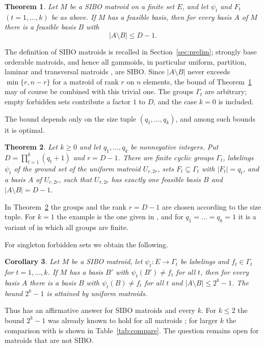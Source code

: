 \documentclass{amsart}
\newtheorem{theorem}{Theorem}[section]
\newtheorem{corollary}[theorem]{Corollary}
\theoremstyle{definition}
\theoremstyle{remark}
\begin{document}
\begin{theorem}\label{thm:main}
Let $M$ be a SIBO matroid on a finite set $E$, and let $\psi_t$ and $F_t$ $(t=1,\dots,k)$ be as above. If $M$ has a feasible basis, then for every basis $A$ of $M$ there is a feasible basis $B$ with
\[
|A\setminus B|\le D-1.
\]
\end{theorem}

The definition of SIBO matroids is recalled in Section~\ref{sec:prelim}; strongly base orderable matroids, and hence all gammoids, in particular uniform, partition, laminar and transversal matroids \cite[Section~42.6c]{Schrijver}, are SIBO. Since $|A\setminus B|$ never exceeds $\min\{r,n-r\}$ for a matroid of rank $r$ on $n$ elements, the bound of Theorem~\ref{thm:main} may of course be combined with this trivial one. The groups $\Gamma_t$ are arbitrary; empty forbidden sets contribute a factor $1$ to $D$, and the case $k=0$ is included.

The bound depends only on the size tuple $(q_1,\dots,q_k)$, and among such bounds it is optimal.

\begin{theorem}\label{thm:sharp}
Let $k\ge0$ and let $q_1,\dots,q_k$ be nonnegative integers. Put $D=\prod_{t=1}^k(q_t+1)$ and $r=D-1$. There are finite cyclic groups $\Gamma_t$, labelings $\psi_t$ of the ground set of the uniform matroid $U_{r,2r}$, sets $F_t\subseteq\Gamma_t$ with $|F_t|=q_t$, and a basis $A$ of $U_{r,2r}$, such that $U_{r,2r}$ has exactly one feasible basis $B$ and $|A\setminus B|=D-1$.
\end{theorem}

In Theorem~\ref{thm:sharp} the groups and the rank $r=D-1$ are chosen according to the size tuple. For $k=1$ the example is the one given in \cite[Section~5]{HIMOS-full}, and for $q_1=\dots=q_k=1$ it is a variant of \cite[Example~5.1]{GMOSY} in which all groups are finite.

For singleton forbidden sets we obtain the following.

\begin{corollary}\label{cor:singletons}
Let $M$ be a SIBO matroid, let $\psi_t\colon E\to\Gamma_t$ be labelings and $f_t\in\Gamma_t$ for $t=1,\dots,k$. If $M$ has a basis $B'$ with $\psi_t(B')\ne f_t$ for all $t$, then for every basis $A$ there is a basis $B$ with $\psi_t(B)\ne f_t$ for all $t$ and $|A\setminus B|\le2^k-1$. The bound $2^k-1$ is attained by uniform matroids.
\end{corollary}

Thus \cite[Question~6.2]{GMOSY} has an affirmative answer for SIBO matroids and every $k$. For $k\le2$ the bound $2^k-1$ was already known to hold for all matroids \cite{HIMOS-full,GMOSY}; for larger $k$ the comparison with \cite[Theorem~5.5]{GMOSY} is shown in Table~\ref{tab:compare}. The question remains open for matroids that are not SIBO.
\end{document}
